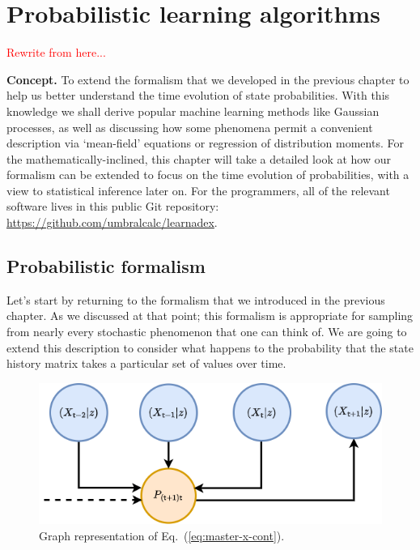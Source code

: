 \chapter{\sffamily Probabilistic learning algorithms}

\textcolor{red}{Rewrite from here...}

{\bfseries\sffamily Concept.} To extend the formalism that we developed in the previous chapter to help us better understand the time evolution of state probabilities. With this knowledge we shall derive popular machine learning methods like Gaussian processes, as well as discussing how some phenomena permit a convenient description via `mean-field' equations or regression of distribution moments. For the mathematically-inclined, this chapter will take a detailed look at how our formalism can be extended to focus on the time evolution of probabilities, with a view to statistical inference later on. For the programmers, all of the relevant software lives in this public Git repository: \href{https://github.com/umbralcalc/learndadex}{https://github.com/umbralcalc/learnadex}.

\section{\sffamily Probabilistic formalism}

Let's start by returning to the formalism that we introduced in the previous chapter. As we discussed at that point; this formalism is appropriate for sampling from nearly every stochastic phenomenon that one can think of. We are going to extend this description to consider what happens to the probability that the state history matrix takes a particular set of values over time.

\begin{figure}[h]
\centering
\includegraphics[width=12cm]{images/chapter-2-master-eq-graph.drawio.png}
\caption{Graph representation of Eq.~(\ref{eq:master-x-cont}).}
\label{fig:master-eqn}
\end{figure} 

